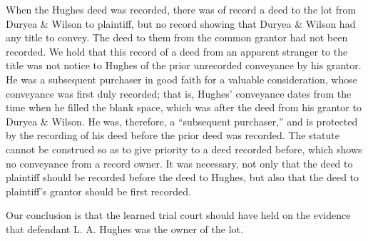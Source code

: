 When the Hughes deed was recorded, there was of record a deed to the lot from
Duryea \& Wilson to plaintiff, but no record showing that Duryea \& Wilson had
any title to convey. The deed to them from the common grantor had not been
recorded. We hold that this record of a deed from an apparent stranger to the
title was not notice to Hughes of the prior unrecorded conveyance by his
grantor. He was a subsequent purchaser in good faith for a valuable
consideration, whose conveyance was first duly recorded; that is, Hughes'
conveyance dates from the time when he filled the blank space, which was after
the deed from his grantor to Duryea \& Wilson. He was, therefore, a ``subsequent
purchaser,'' and is protected by the recording of his deed before the prior deed
was recorded. The statute cannot be construed so as to give priority to a deed
recorded before, which shows no conveyance from a record owner. It was
necessary, not only that the deed to plaintiff should be recorded before the
deed to Hughes, but also that the deed to plaintiff's grantor should be first
recorded. 

Our conclusion is that the learned trial court should have held on the evidence
that defendant L. A. Hughes was the owner of the lot.


